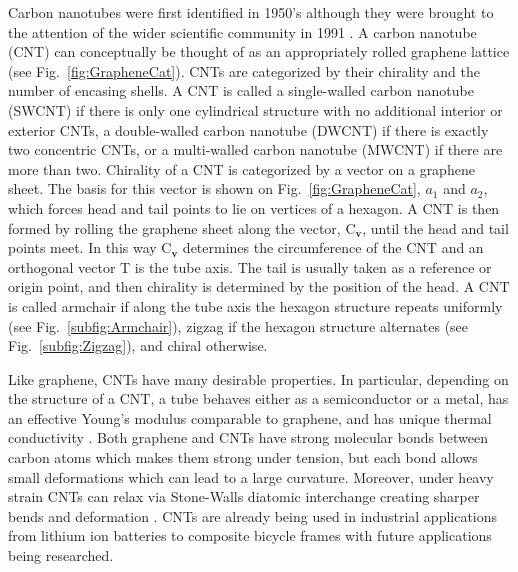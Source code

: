 	Carbon nanotubes were first identified in 1950's although they were brought to the attention of the wider scientific community in 1991 \cite{Iijima1991}. A carbon nanotube (CNT) can conceptually be thought of as an appropriately rolled graphene lattice (see Fig.~\ref{fig:GrapheneCat}). CNTs are categorized by their chirality and the number of encasing shells. A CNT is called a single-walled carbon nanotube (SWCNT) if there is only one cylindrical structure with no additional interior or exterior CNTs, a double-walled carbon nanotube (DWCNT) if there is exactly two concentric CNTs, or a multi-walled carbon nanotube (MWCNT) if there are more than two. Chirality of a CNT is categorized by a vector on a graphene sheet. The basis for this vector is shown on Fig.~\ref{fig:GrapheneCat}, $a_1$ and $a_2$, which forces head and tail points to lie on vertices of a hexagon. A CNT is then formed by rolling the graphene sheet along the vector, $\mbox{C}_{\textbf{v}}$, until the head and tail points meet. In this way $\mbox{C}_{\textbf{v}}$ determines the circumference of the CNT and an orthogonal vector T is the tube axis. The tail is usually taken as a reference or origin point, and then chirality is determined by the position of the head. A CNT is called armchair if along the tube axis the hexagon structure repeats uniformly (see Fig.~\ref{subfig:Armchair}), zigzag if the hexagon structure alternates (see Fig.~\ref{subfig:Zigzag}), and chiral otherwise.
	
	Like graphene, CNTs have many desirable properties. In particular, depending on the structure of a CNT, a tube behaves either as a semiconductor or a metal, has an effective Young's modulus comparable to graphene, and has unique thermal conductivity \cite{Dresselhaus2004}. Both graphene and CNTs have strong molecular bonds between carbon atoms which makes them strong under tension, but each bond allows small deformations which can lead to a large curvature. Moreover, under heavy strain CNTs can relax via Stone-Walls diatomic interchange creating sharper bends and deformation \cite{Yakobson1998}. CNTs are already being used in industrial applications from lithium ion batteries to composite bicycle frames \cite{De2013} with future applications being researched.
	
